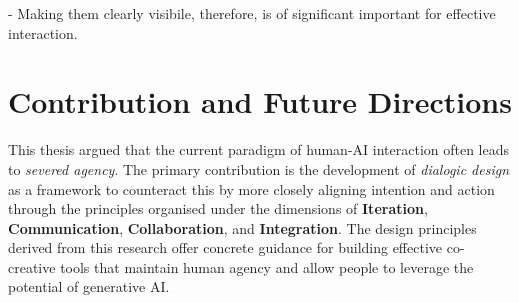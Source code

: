 - Making them clearly visibile, therefore, is of significant important for effective interaction. 

\section{Contribution and Future Directions}
This thesis argued that the current paradigm of human-AI interaction often leads to \textit{severed agency}. The primary contribution is the development of \textit{dialogic design} as a framework to counteract this by more closely aligning intention and action through the principles organised under the dimensions of \textbf{Iteration}, \textbf{Communication}, \textbf{Collaboration}, and \textbf{Integration}. The design principles derived from this research offer concrete guidance for building effective co-creative tools that maintain human agency and allow people to leverage the potential of generative AI.
